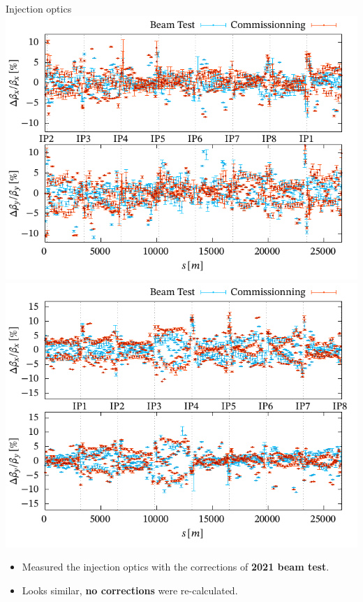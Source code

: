 \documentclass[4pt,usenames,dvipsnames,aspectratio=169,table]{beamer}
\newcommand{\highl}[1]{\textbf{#1}}
\begin{document}
\begin{frame}{Injection optics}
    \includegraphics[width=0.49\linewidth]{images/beamtest/b1_bb.pdf}
    \hfill
    \includegraphics[width=0.49\linewidth]{images/beamtest/b2_bb.pdf}
    
    \begin{itemize}
        \item  Measured the injection optics with the corrections of \highl{2021 beam test}.
        \item Looks similar, \highl{no corrections} were re-calculated.
    \end{itemize}
\end{frame}


\end{document}
